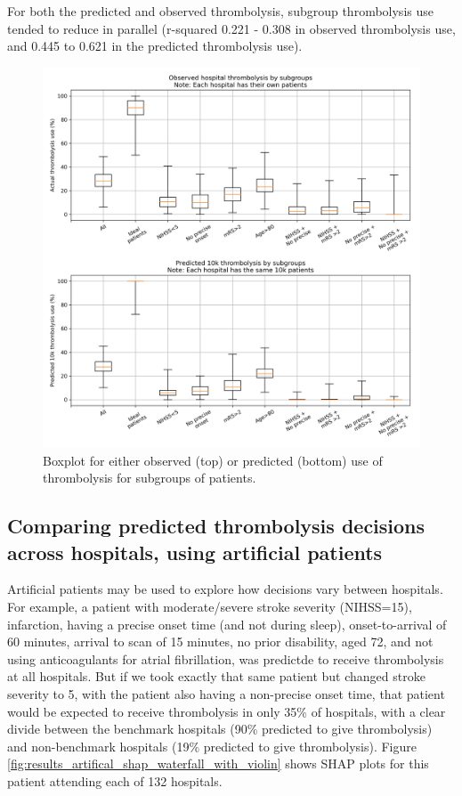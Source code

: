 For both the predicted and observed thrombolysis, subgroup thrombolysis use tended to reduce in parallel (r-squared 0.221 - 0.308 in observed thrombolysis use, and 0.445 to 0.621 in the predicted thrombolysis use).

\begin{figure}
\centering
\includegraphics[width=1\textwidth]{./images/15a_actual_vs_modelled_subgroup_violin}
\caption{Boxplot for either observed (top) or predicted (bottom) use of thrombolysis for subgroups of patients.}
\label{fig:results_boxplot}
\end{figure}


\subsection{Comparing predicted thrombolysis decisions across hospitals, using artificial patients}

Artificial patients may be used to explore how decisions vary between hospitals. For example, a patient with moderate/severe stroke severity (NIHSS=15), infarction, having a precise onset time (and not during sleep), onset-to-arrival of 60 minutes, arrival to scan of 15 minutes, no prior disability, aged 72, and not using anticoagulants for atrial fibrillation, was predictde to receive thrombolysis at all hospitals. But if we took exactly that same patient but changed stroke severity to 5, with the patient also having a non-precise onset time, that patient would be expected to receive thrombolysis in only 35\% of hospitals, with a clear divide between the benchmark hospitals (90\% predicted to give thrombolysis) and non-benchmark hospitals (19\% predicted to give thrombolysis). Figure \ref{fig:results_artifical_shap_waterfall_with_violin} shows SHAP  plots for this patient attending each of 132 hospitals.

